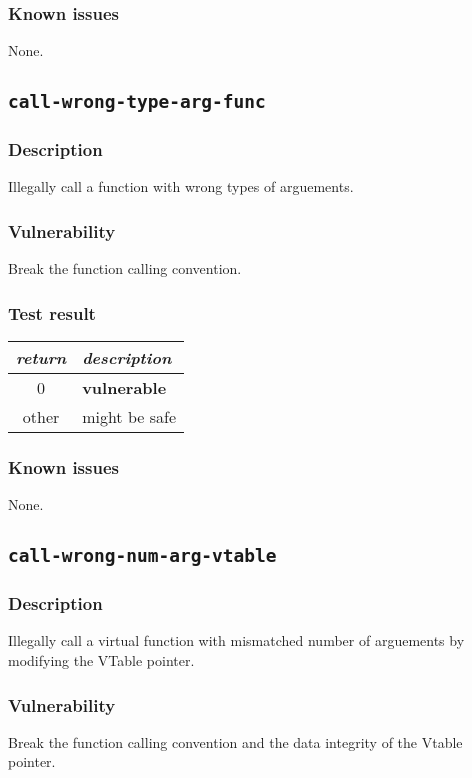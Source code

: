 \documentclass[a4paper]{book}
\begin{document}
\subsubsection{Known issues}
None.

\newpage
\subsection{\texttt{call-wrong-type-arg-func}}\label{test-call-wrong-type-arg-func}

\subsubsection{Description}
Illegally call a function with wrong types of arguements.

\subsubsection{Vulnerability}
Break the function calling convention.

\subsubsection{Test result}
\begin{tabular}{cl}
  \toprule
  \emph{return}  & \emph{description} \\
  \midrule
  0              & \textbf{vulnerable} \\
  other          & might be safe \\
  \bottomrule
\end{tabular}

\subsubsection{Known issues}
None.

\newpage
\subsection{\texttt{call-wrong-num-arg-vtable}}\label{test-call-wrong-num-arg-vtable}

\subsubsection{Description}
Illegally call a virtual function with mismatched number of arguements by modifying the VTable pointer.

\subsubsection{Vulnerability}
Break the function calling convention and the data integrity of the Vtable pointer.
\end{document}
